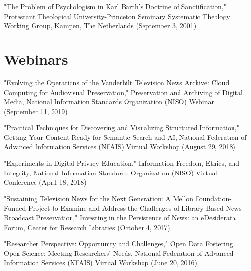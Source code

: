 \documentclass[10pt]{res} %
\begin{document}
\begin{resume}
\begin{hangparas}{.25in}{1}"The Problem of Psychologism in Karl Barth’s Doctrine of Sanctification," Protestant Theological University-Princeton Seminary Systematic Theology Working Group, Kampen, The Netherlands (September 3, 2001)\end{hangparas}

\section{Webinars}

\begin{hangparas}{.25in}{1}"\href{https://www.niso.org/events/2019/09/preservation-and-archiving-digital-media}{Evolving the Operations of the Vanderbilt Television News Archive: Cloud Computing for Audiovisual Preservation}," Preservation and Archiving of Digital Media, National Information Standards Organization (NISO) Webinar (September 11, 2019)\end{hangparas}

\begin{hangparas}{.25in}{1}"Practical Techniques for Discovering and Visualizing Structured Information," Getting Your Content Ready for Semantic Search and AI, National Federation of Advanced Information Services (NFAIS) Virtual Workshop (August 29, 2018)\end{hangparas}

\begin{hangparas}{.25in}{1}"Experiments in Digital Privacy Education," Information Freedom, Ethics, and Integrity, National Information Standards Organization (NISO) Virtual Conference (April 18, 2018)\end{hangparas}

\begin{hangparas}{.25in}{1}"Sustaining Television News for the Next Generation: A Mellon Foundation-Funded Project to Examine and Address the Challenges of Library-Based News Broadcast Preservation," Investing in the Persistence of News: an eDesiderata Forum, Center for Research Libraries (October 4, 2017)\end{hangparas}

\begin{hangparas}{.25in}{1}"Researcher Perspective: Opportunity and Challenges," Open Data Fostering Open Science: Meeting Researchers’ Needs, National Federation of Advanced Information Services (NFAIS) Virtual Workshop (June 20, 2016)\end{hangparas}


\end{resume}
\end{document}
